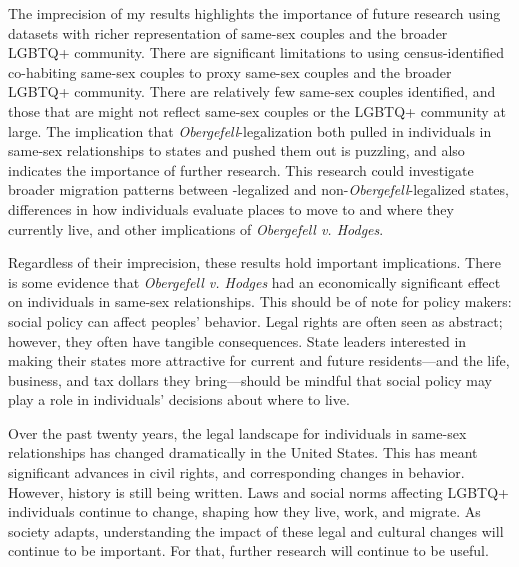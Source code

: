 \documentclass[12pt,letterpaper]{article}
\begin{document}
The imprecision of my results highlights the importance of future research using datasets with richer representation of same-sex couples and the broader LGBTQ+ community. There are significant limitations to using census-identified co-habiting same-sex couples to proxy same-sex couples and the broader LGBTQ+ community. There are relatively few same-sex couples identified, and those that are might not reflect same-sex couples or the LGBTQ+ community at large. The implication that \textit{Obergefell}-legalization both pulled in individuals in same-sex relationships to states and pushed them out is puzzling, and also indicates the importance of further research. This research could investigate broader migration patterns between -legalized and non-\textit{Obergefell}-legalized states, differences in how individuals evaluate places to move to and where they currently live, and other implications of \textit{Obergefell v. Hodges}. 

Regardless of their imprecision, these results hold important implications. There is some evidence that \textit{Obergefell v. Hodges} had an economically significant effect on individuals in same-sex relationships. This should be of note for policy makers: social policy can affect peoples' behavior. Legal rights are often seen as abstract; however, they often have tangible consequences. State leaders interested in making their states more attractive for current and future residents---and the life, business, and tax dollars they bring---should be mindful that social policy may play a role in individuals' decisions about where to live. 


Over the past twenty years, the legal landscape for individuals in same-sex relationships has changed dramatically in the United States. This has meant significant advances in civil rights, and corresponding changes in behavior. However, history is still being written. Laws and social norms affecting LGBTQ+ individuals continue to change, shaping how they live, work, and migrate. As society adapts, understanding the impact of these legal and cultural changes will continue to be important. For that, further research will continue to be useful.

\newpage


\end{document}

